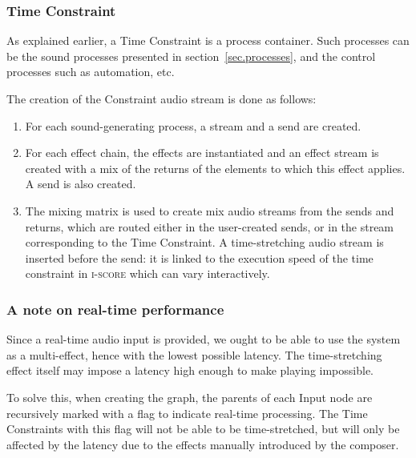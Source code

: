 \documentclass{article}
\newcommand*{\iscore}{\textsc{i-score}\xspace}
\begin{document}
\subsubsection{Time Constraint}
As explained earlier, a Time Constraint is a process container.
Such processes can be the sound processes presented in section~\ref{sec.processes}, and 
the control processes such as automation, etc.

The creation of the Constraint audio stream is done as follows: 
\begin{enumerate}
    \item For each sound-generating process, a stream and a send are created.
    \item For each effect chain, the effects are instantiated and an effect stream is created with a mix of the returns of the elements to which this effect applies.
    A send is also created.
    \item The mixing matrix is used to create mix audio streams from the sends and returns, which are routed either in the user-created sends, or in the stream corresponding to the Time Constraint.
    A time-stretching audio stream is inserted before the send: it is linked to the execution speed of the time constraint in \iscore which can vary interactively.
\end{enumerate} 

\subsubsection{A note on real-time performance}
Since a real-time audio input is provided, we ought to be able to 
use the system as a multi-effect, hence with the lowest possible latency.
The time-stretching effect itself may impose a latency high enough to make 
playing impossible.

To solve this, when creating the graph, the parents of each Input node are recursively marked 
with a flag to indicate real-time processing. 
The Time Constraints with this flag will not be able to be time-stretched, but will only 
be affected by the latency due to the effects manually introduced by the composer.



\end{document}
